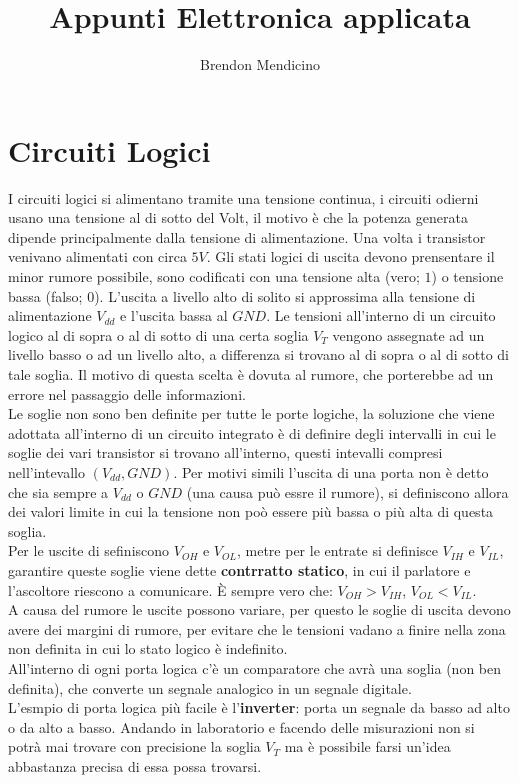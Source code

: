 \documentclass[12pt]{article}
\title{Appunti Elettronica applicata}
\author{Brendon Mendicino}
\begin{document}
\maketitle
\tableofcontents


\newpage
\section{Circuiti Logici}
I circuiti logici si alimentano tramite una tensione continua, i circuiti odierni usano una tensione al di sotto del Volt, il motivo \`e che la potenza generata dipende principalmente dalla tensione di alimentazione. Una volta i transistor venivano alimentati con circa $5V$.
Gli stati logici di uscita devono prensentare il minor rumore possibile, sono codificati con una tensione alta (vero; $1$) o tensione bassa (falso; $0$). L'uscita a livello alto di solito si approssima alla tensione di alimentazione $V_{dd}$ e l'uscita bassa al $GND$. Le tensioni all'interno di un circuito logico al di sopra o al di sotto di una certa soglia $V_T$ vengono assegnate ad un livello basso o ad un livello alto, a differenza si trovano al di sopra o al di sotto di tale soglia. Il motivo di questa scelta \`e dovuta al rumore, che porterebbe ad un errore nel passaggio delle informazioni. \\
Le soglie non sono ben definite per tutte le porte logiche, la soluzione che viene adottata all'interno di un circuito integrato \`e di definire degli intervalli in cui le soglie dei vari transistor si trovano all'interno, questi intevalli compresi nell'intevallo $(V_{dd}, GND)$. Per motivi simili l'uscita di una porta non \`e detto che sia sempre a $V_{dd}$ o $GND$ (una causa pu\`o essre il rumore), si definiscono allora dei valori limite in cui la tensione non po\`o essere pi\`u bassa o pi\`u alta di questa soglia. \\
Per le uscite di sefiniscono $V_{OH}$ e $V_{OL}$, metre per le entrate si definisce $V_{IH}$ e $V_{IL}$, garantire queste soglie viene dette \textbf{contrratto statico}, in cui il parlatore e l'ascoltore riescono a comunicare. \`E sempre vero che: $V_{OH} > V_{IH}$, $V_{OL} < V_{IL}$. \\
A causa del rumore le uscite possono variare, per questo le soglie di uscita devono avere dei margini di rumore, per evitare che le tensioni vadano a finire nella zona non definita in cui lo stato logico \`e indefinito. \\
All'interno di ogni porta logica c'\`e un comparatore che avr\`a una soglia (non ben definita), che converte un segnale analogico in un segnale digitale. \\
L'esmpio di porta logica pi\`u facile \`e l'\textbf{inverter}: porta un segnale da basso ad alto o da alto a basso. Andando in laboratorio e facendo delle misurazioni non si potr\`a mai trovare con precisione la soglia $V_T$ ma \`e possibile farsi un'idea abbastanza precisa di essa possa trovarsi.
\end{document}
